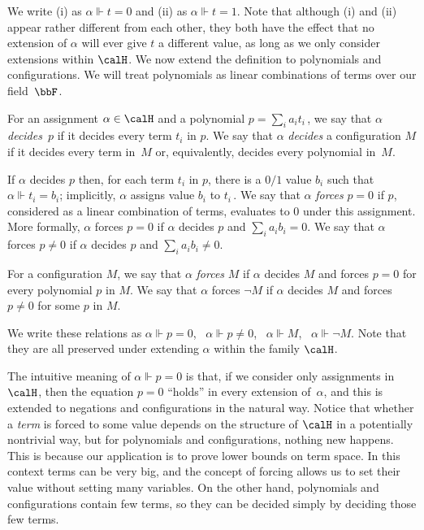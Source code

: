 We write (i) as $\alpha \Vdash t=0$ and (ii) as $\alpha \Vdash t=1$.
Note that although (i) and  (ii) appear rather different from each other, they both have
the effect that no extension of $\alpha$ will ever give $t$ a different value,
as long as we only consider extensions within $\calH$.
We now extend the definition to polynomials and configurations.
We will treat polynomials as  linear combinations of terms over our field~$\bbF$.

\begin{definition}\label{def:forcing}
For an assignment $\alpha \in \calH$ and a polynomial $p=\sum_{i}a_i t_i$\,,
we say that $\alpha$ \emph{decides}~$p$ if it decides every term $t_i$ in $p$.
We say that $\alpha$ \emph{decides} a configuration $M$ if it decides every term in~$M$
or, equivalently, decides every polynomial in~$M$.

If $\alpha$ decides $p$ then, for each term $t_i$ in $p$, there is a $0/1$ value
$b_i$ such that $\alpha \Vdash t_i=b_i$; implicitly, $\alpha$ assigns value $b_i$ to $t_i$\,. 
We say that $\alpha$ \emph{forces} $p=0$ 
if $p$, considered as a linear combination of terms, evaluates to $0$ under this assignment.
More formally, $\alpha$ forces $p=0$ if $\alpha$ decides $p$ and $\sum_{i} a_ib_i =0$.
We say that $\alpha$ forces $p \neq 0$ if $\alpha$ decides $p$ and $\sum_{i} a_ib_i \neq 0$.

For a configuration $M$, we say that $\alpha$ \emph{forces} $M$ if $\alpha$ decides
$M$ and forces $p=0$ for every polynomial $p$ in $M$. We say that 
$\alpha$ forces $\neg M$ if $\alpha$ decides $M$ and forces $p \neq 0$ for some $p$ in $M$.
\end{definition}

We write these relations as $\alpha \Vdash p=0$, \ $\alpha \Vdash p \neq 0$, \
$\alpha \Vdash M$, \ $\alpha \Vdash \neg M$.
 Note that 
they are all preserved under extending $\alpha$ within the family $\calH$.

The intuitive meaning of $\alpha \Vdash p=0$ is that, if we consider only assignments in $\calH$,
then the equation $p=0$ ``holds'' in every extension of~$\alpha$, and this 
is extended to negations and configurations in the natural way.
Notice that whether a \emph{term} is forced to some value depends on the structure of $\calH$
in a potentially nontrivial way, but for polynomials and configurations, nothing new happens. 
This is because our application is to prove lower bounds on term space. 
In this context terms can be very big, and the concept of forcing allows us
to set their value without setting  many variables. On the other hand, 
polynomials and configurations contain few terms, so they can be decided simply by deciding those few terms.

